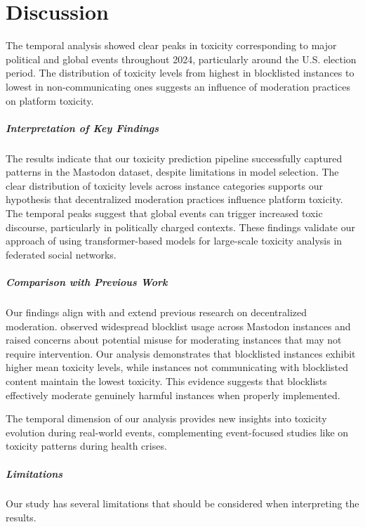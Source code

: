 \chapter{Discussion} \label{discussion}

The temporal analysis showed clear peaks in toxicity corresponding to major political and global events throughout 2024, particularly around the U.S. election period. The distribution of toxicity levels from highest in blocklisted instances to lowest in non-communicating ones suggests an influence of moderation practices on platform toxicity.

\paragraph{Interpretation of Key Findings}
The results indicate that our toxicity prediction pipeline successfully captured patterns in the Mastodon dataset, despite limitations in model selection. The clear distribution of toxicity levels across instance categories supports our hypothesis that decentralized moderation practices influence platform toxicity. The temporal peaks suggest that global events can trigger increased toxic discourse, particularly in politically charged contexts. These findings validate our approach of using transformer-based models for large-scale toxicity analysis in federated social networks.

\paragraph{Comparison with Previous Work}
Our findings align with and extend previous research on decentralized moderation. \citet{bono:2024} observed widespread blocklist usage across Mastodon instances and raised concerns about potential misuse for moderating instances that may not require intervention. Our analysis demonstrates that blocklisted instances exhibit higher mean toxicity levels, while instances not communicating with blocklisted content maintain the lowest toxicity. This evidence suggests that blocklists effectively moderate genuinely harmful instances when properly implemented. 

The temporal dimension of our analysis provides new insights into toxicity evolution during real-world events, complementing event-focused studies like \citet{fan:2022} on toxicity patterns during health crises.

\paragraph{Limitations}
Our study has several limitations that should be considered when interpreting the results.

